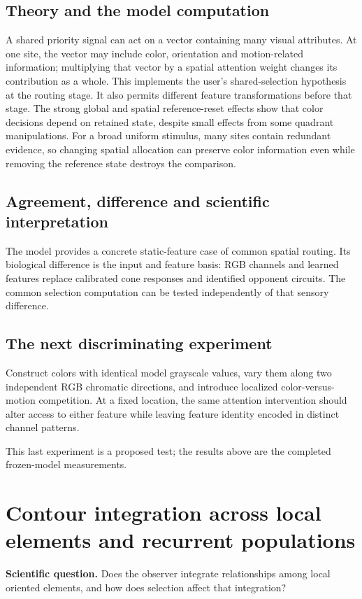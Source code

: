 \documentclass[11pt]{article}
\begin{document}
\subsection{Theory and the model computation}
A shared priority signal can act on a vector containing many visual attributes. At one site, the vector may include color, orientation and motion-related information; multiplying that vector by a spatial attention weight changes its contribution as a whole. This implements the user’s shared-selection hypothesis at the routing stage. It also permits different feature transformations before that stage. The strong global and spatial reference-reset effects show that color decisions depend on retained state, despite small effects from some quadrant manipulations. For a broad uniform stimulus, many sites contain redundant evidence, so changing spatial allocation can preserve color information even while removing the reference state destroys the comparison.

\subsection{Agreement, difference and scientific interpretation}
The model provides a concrete static-feature case of common spatial routing. Its biological difference is the input and feature basis: RGB channels and learned features replace calibrated cone responses and identified opponent circuits. The common selection computation can be tested independently of that sensory difference.

\subsection{The next discriminating experiment}
Construct colors with identical model grayscale values, vary them along two independent RGB chromatic directions, and introduce localized color-versus-motion competition. At a fixed location, the same attention intervention should alter access to either feature while leaving feature identity encoded in distinct channel patterns.

This last experiment is a proposed test; the results above are the completed frozen-model measurements.
\clearpage\section{Contour integration across local elements and recurrent populations}
\textbf{Scientific question.} Does the observer integrate relationships among local oriented elements, and how does selection affect that integration?
\end{document}
